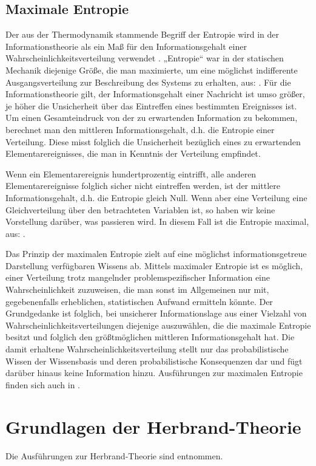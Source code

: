 \documentclass[a4paper, 11pt]{book}
\begin{document}
{\section{Maximale Entropie} 
\label{MaxEnt}
Der aus der Thermodynamik stammende Begriff der Entropie wird in der Informationstheorie als ein Maß für den Informationsgehalt einer Wahrscheinlichkeitsverteilung verwendet \cite{RKI97}.
„Entropie“ war in der statischen Mechanik diejenige Größe, die man maximierte, um eine möglichst indifferente Ausgangsverteilung zur Beschreibung des Systems zu erhalten, aus: \cite{BKI08}.
Für die Informationstheorie gilt, der Informationsgehalt einer Nachricht ist umso größer, je höher die Unsicherheit über das Eintreffen eines bestimmten Ereignisses ist. Um einen Gesamteindruck von der zu erwartenden Information zu bekommen, berechnet man den mittleren Informationsgehalt, d.h. die Entropie einer Verteilung. Diese misst folglich die Unsicherheit bezüglich eines zu erwartenden Elementarereignisses, die man in Kenntnis der Verteilung empfindet.

Wenn ein Elementarereignis hundertprozentig eintrifft, alle anderen Elementarereignisse folglich sicher nicht eintreffen werden, ist der mittlere Informationsgehalt, d.h. die Entropie gleich Null. Wenn aber eine Verteilung eine Gleichverteilung über den betrachteten Variablen ist, so haben wir keine Vorstellung darüber, was passieren wird. In diesem Fall ist die Entropie maximal, aus: \cite{BKI08}.

Das Prinzip der maximalen Entropie zielt auf eine möglichst informationsgetreue Darstellung verfügbaren Wissens ab. Mittels maximaler Entropie ist es möglich, einer Verteilung trotz mangelnder problemspezifischer Information eine Wahrscheinlichkeit zuzuweisen, die man sonst im Allgemeinen nur mit, gegebenenfalls erheblichen, statistischen Aufwand ermitteln könnte. Der Grundgedanke ist folglich, bei unsicherer Informationslage aus einer Vielzahl von Wahrscheinlichkeitsverteilungen diejenige auszuwählen, die die maximale Entropie besitzt und folglich den größtmöglichen mittleren Informationsgehalt hat. Die damit erhaltene Wahrscheinlichkeitsverteilung stellt nur das probabilistische Wissen der Wissensbasis und deren probabilistische Konsequenzen dar und fügt darüber hinaus keine Information hinzu.
Ausführungen zur maximalen Entropie finden sich auch in \cite{TFLKIB10}.

\chapter{Grundlagen der Herbrand-Theorie}
\label{Herb}
Die Ausführungen zur Herbrand-Theorie sind \cite{BKI08} entnommen.

}
\end{document}
